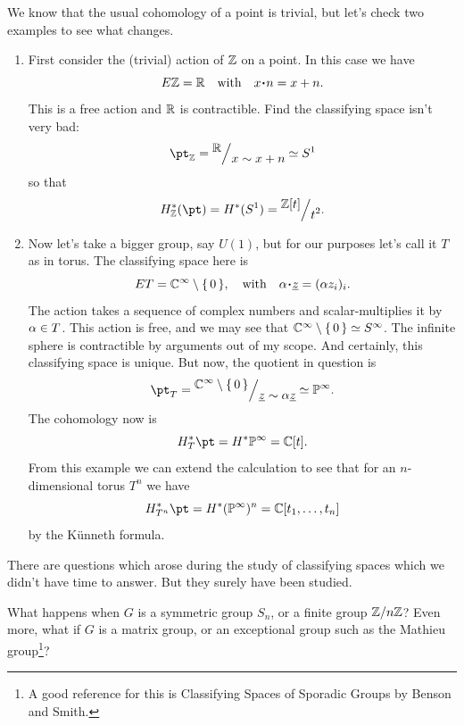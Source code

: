 \documentclass[12pt]{memoir}
\begin{document}
\begin{Ex}\label{ex:equiv-cohom-point}
We know that the usual cohomology of a point is trivial, but let's check two examples to see what changes.
\begin{enumerate}
    \item First consider the (trivial) action of $\mathbb{Z}$ on a point. In this case we have
    $$E\bZ=\bR\word{with}x\.n=x+n.$$
    This is a free action and $\mathbb{R}$ is contractible. Find the classifying space isn't very bad:
    $$\pt_\bZ=\quot{\bR}{x\sim x+n}\isom S^1$$
    so that 
    $$H_\bZ^\ast(\pt)=H^\ast(S^1)=\quot{\bZ[t]}{t^2}.$$
    \item Now let's take a bigger group, say $U(1)$, but for our purposes let's call it $T$ as in torus. The classifying space here is 
    $$ET=\bC^\infty\less\set{0},\word{with}\al\.\un{z}=(\al z_i)_i.$$
    The action takes a sequence of complex numbers and scalar-multiplies it by $\alpha\in T$. 
    This action is free, and we may see that $\mathbb{C}^\infty\setminus\{\,0\,\}\simeq S^\infty$. The infinite sphere is contractible by arguments out of my scope. And certainly, this classifying space is unique. But now, the quotient in question is 
    $$\pt_T=\quot{\bC^\infty\less\set{0}}{\un{z}\sim \al\un{z}}\isom\bP^\infty.$$
    The cohomology now is 
    $$H^\ast_{T}\pt=H^\ast\bP^\infty=\bC[t].$$
    From this example we can extend the calculation to see that for an $n$-dimensional torus $T^n$ we have 
    $$H^\ast_{T^n}\pt=H^\ast(\bP^\infty)^n=\bC[t_1,\dots,t_n]$$
    by the K\"unneth formula.
\end{enumerate}
\end{Ex}

There are questions which arose during the study of classifying spaces which we didn't have time to answer. But they surely have been studied.

\begin{Qn}
    What happens when $G$ is a symmetric group $S_n$, or a finite group $\mathbb{Z}/n\mathbb{Z}$? Even more, what if $G$ is a matrix group, or an exceptional group such as the Mathieu group\footnote{A good reference for this is Classifying Spaces of Sporadic Groups by Benson and Smith.}?  
\end{Qn}
\end{document}
